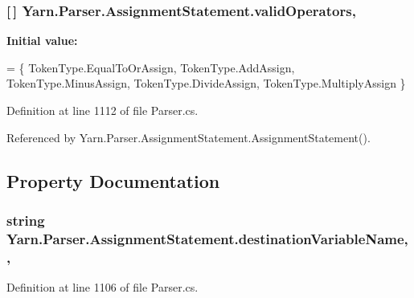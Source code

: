 \hypertarget{a00029_af3d393da2f684272251805d3471b6c7a}{
\subsubsection[{valid\-Operators}]{ \mbox{[}$\,$\mbox{]} Yarn.\-Parser.\-Assignment\-Statement.\-valid\-Operators\hspace{0.3cm}{\ttfamily [static]}, {\ttfamily [private]}}}\label{a00029_af3d393da2f684272251805d3471b6c7a}
{\bfseries Initial value\-:}
\begin{DoxyCode}
= \{
                TokenType.EqualToOrAssign,
                TokenType.AddAssign,
                TokenType.MinusAssign,
                TokenType.DivideAssign,
                TokenType.MultiplyAssign
            \}
\end{DoxyCode}


Definition at line 1112 of file Parser.\-cs.



Referenced by Yarn.\-Parser.\-Assignment\-Statement.\-Assignment\-Statement().



\subsection{Property Documentation}
\hypertarget{a00029_a4e764622b716a4138d1fd9e005c41336}{
\subsubsection[{destination\-Variable\-Name}]{\setlength{\rightskip}{0pt plus 5cm}string Yarn.\-Parser.\-Assignment\-Statement.\-destination\-Variable\-Name\hspace{0.3cm}{\ttfamily [get]}, {\ttfamily [set]}, {\ttfamily [package]}}}\label{a00029_a4e764622b716a4138d1fd9e005c41336}


Definition at line 1106 of file Parser.\-cs.



